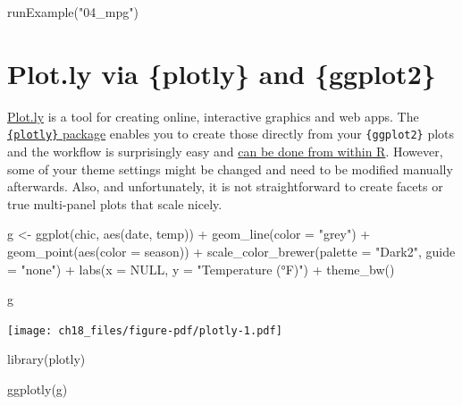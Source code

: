\documentclass[
  letterpaper,
]{scrbook}
\newenvironment{Shaded}{\begin{snugshade}}{\end{snugshade}}
\newcommand{\AttributeTok}[1]{\textcolor[rgb]{0.40,0.45,0.13}{#1}}
\newcommand{\ConstantTok}[1]{\textcolor[rgb]{0.56,0.35,0.01}{#1}}
\newcommand{\FunctionTok}[1]{\textcolor[rgb]{0.28,0.35,0.67}{#1}}
\newcommand{\NormalTok}[1]{\textcolor[rgb]{0.00,0.23,0.31}{#1}}
\newcommand{\OtherTok}[1]{\textcolor[rgb]{0.00,0.23,0.31}{#1}}
\newcommand{\SpecialCharTok}[1]{\textcolor[rgb]{0.37,0.37,0.37}{#1}}
\newcommand{\StringTok}[1]{\textcolor[rgb]{0.13,0.47,0.30}{#1}}
\begin{document}
\begin{Shaded}
\begin{Highlighting}[]
\FunctionTok{runExample}\NormalTok{(}\StringTok{"04\_mpg"}\NormalTok{)}
\end{Highlighting}
\end{Shaded}

\section{Plot.ly via \{plotly\} and
\{ggplot2\}}\label{plot.ly-via-plotly-and-ggplot2}

\href{https://chart-studio.plotly.com/feed/\#/}{Plot.ly} is a tool for
creating online, interactive graphics and web apps. The
\href{https://plot.ly/r/getting-started/}{\texttt{\{plotly\}} package}
enables you to create those directly from your \texttt{\{ggplot2\}}
plots and the workflow is surprisingly easy and
\href{https://plotly-r.com/}{can be done from within R}. However, some
of your theme settings might be changed and need to be modified manually
afterwards. Also, and unfortunately, it is not straightforward to create
facets or true multi-panel plots that scale nicely.

\begin{Shaded}
\begin{Highlighting}[]
\NormalTok{g }\OtherTok{\textless{}{-}} \FunctionTok{ggplot}\NormalTok{(chic, }\FunctionTok{aes}\NormalTok{(date, temp)) }\SpecialCharTok{+}
  \FunctionTok{geom\_line}\NormalTok{(}\AttributeTok{color =} \StringTok{"grey"}\NormalTok{) }\SpecialCharTok{+}
  \FunctionTok{geom\_point}\NormalTok{(}\FunctionTok{aes}\NormalTok{(}\AttributeTok{color =}\NormalTok{ season)) }\SpecialCharTok{+}
  \FunctionTok{scale\_color\_brewer}\NormalTok{(}\AttributeTok{palette =} \StringTok{"Dark2"}\NormalTok{, }\AttributeTok{guide =} \StringTok{"none"}\NormalTok{) }\SpecialCharTok{+}
  \FunctionTok{labs}\NormalTok{(}\AttributeTok{x =} \ConstantTok{NULL}\NormalTok{, }\AttributeTok{y =} \StringTok{"Temperature (°F)"}\NormalTok{) }\SpecialCharTok{+}
  \FunctionTok{theme\_bw}\NormalTok{()}

\NormalTok{g}
\end{Highlighting}
\end{Shaded}

\texttt{[image: ch18\_files/figure-pdf/plotly-1.pdf]}

\begin{Shaded}
\begin{Highlighting}[]
\FunctionTok{library}\NormalTok{(plotly)}

\FunctionTok{ggplotly}\NormalTok{(g)}
\end{Highlighting}
\end{Shaded}
\end{document}
